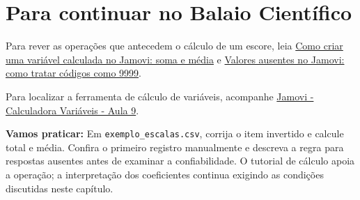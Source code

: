 \section{Para continuar no Balaio Científico}

Para rever as operações que antecedem o cálculo de um escore, leia \href{https://www.balaiocientifico.com/2026/10/como-criar-uma-variavel-calculada-no.html}{Como criar uma variável calculada no Jamovi: soma e média} e \href{https://www.balaiocientifico.com/2026/10/valores-ausentes-no-jamovi-como-tratar.html}{Valores ausentes no Jamovi: como tratar códigos como 9999}.

Para localizar a ferramenta de cálculo de variáveis, acompanhe \href{https://www.youtube.com/watch?v=NBvQphd9FqI}{Jamovi - Calculadora Variáveis - Aula 9}.

\textbf{Vamos praticar:} Em \texttt{exemplo\_escalas.csv}, corrija o item invertido e calcule total e média. Confira o primeiro registro manualmente e descreva a regra para respostas ausentes antes de examinar a confiabilidade. O tutorial de cálculo apoia a operação; a interpretação dos coeficientes continua exigindo as condições discutidas neste capítulo.
